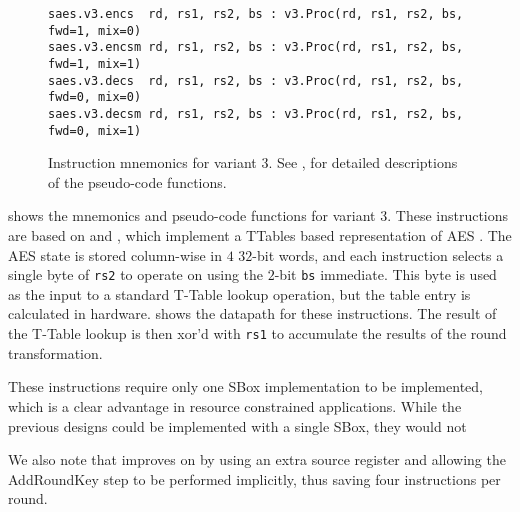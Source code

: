 
\begin{figure}
\begin{lstlisting}[language=pseudo,style=block]
saes.v3.encs  rd, rs1, rs2, bs : v3.Proc(rd, rs1, rs2, bs, fwd=1, mix=0)
saes.v3.encsm rd, rs1, rs2, bs : v3.Proc(rd, rs1, rs2, bs, fwd=1, mix=1)
saes.v3.decs  rd, rs1, rs2, bs : v3.Proc(rd, rs1, rs2, bs, fwd=0, mix=0)
saes.v3.decsm rd, rs1, rs2, bs : v3.Proc(rd, rs1, rs2, bs, fwd=0, mix=1)
\end{lstlisting}
\caption{
    Instruction mnemonics for variant 3.
    See ,  for detailed
    descriptions of the pseudo-code functions.
}
\label{fig:mnemonics:v3}
\end{figure}

 shows the mnemonics and pseudo-code functions
for variant 3.
These instructions are based on
\cite{BBFR:06} and \cite{Saarinen:20},
which implement a TTables based representation of AES \cite{DaeRik:02}.
The AES state is stored column-wise in $4$ $32$-bit words, and
each instruction selects a single byte of {\tt rs2} to operate on
using the $2$-bit {\tt bs} immediate.
This byte is used as the input to a standard T-Table lookup operation,
but the table entry is calculated in hardware.
 shows the datapath for these instructions.
The result of the T-Table lookup is then xor'd with {\tt rs1} to
accumulate the results of the round transformation.

These instructions require only one SBox implementation to be implemented,
which is a clear advantage in resource constrained applications.
While the previous designs could be implemented with a single SBox, they
would not

We also note that \cite{Saarinen:20} improves on \cite{BBFR:06}
by using an extra source register and allowing the AddRoundKey step to be
performed implicitly, thus saving four instructions per round.

